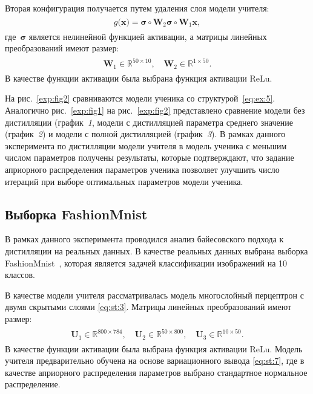 \documentclass[12pt]{a&t}
\begin{document}
Вторая конфигурация получается путем удаления слоя модели учителя:
\begin{gather}
\label{eq:ex:5}
\begin{aligned}
g\bigr(\mathbf{x}\bigr) = \bm{\sigma} \circ \mathbf{W}_2\bm{\sigma} \circ \mathbf{W}_1\mathbf{x},
\end{aligned}
\end{gather}
где~$\bm{\sigma}$ является нелинейной функцией активации, а матрицы линейных преобразований имеют размер:
\begin{gather}
\label{eq:ex:6}
\begin{aligned}
\mathbf{W}_{1} \in \mathbb{R}^{50 \times 10}, \quad \mathbf{W}_{2} \in \mathbb{R}^{1 \times 50}.
\end{aligned}
\end{gather}
 В качестве функции активации была выбрана функция активации $\text{ReLu}$.



На рис.~\ref{exp:fig2} сравниваются модели ученика со структурой~\eqref{eq:ex:5}.
Аналогично рис.~\ref{exp:fig1} на рис.~\ref{exp:fig2} представлено сравнение модели без дистилляции (график~\textit{1}, модели с дистилляцией параметра среднего значение (график~\textit{2}) и модели с полной дистилляцией (график~\textit{3}).
В рамках данного эксперимента по дистилляции модели учителя в модель ученика с меньшим числом параметров получены результаты, которые подтверждают, что задание априорного распределения параметров ученика позволяет улучшить число итераций при выборе оптимальных параметров модели ученика.

\subsection{Выборка FashionMnist}

В рамках данного эксперимента проводился анализ байесовского подхода к дистилляции на реальных данных.  В качестве реальных данных выбрана выборка FashionMnist~\cite{fashionmnist}, которая является задачей классификации изображений на 10 классов.

В качестве модели учителя рассматривалась модель многослойный перцептрон с двумя скрытыми слоями \eqref{eq:st:3}. Матрицы линейных преобразований имеют размер:
\begin{gather}
\label{eq:ex:7}
\begin{aligned}
\mathbf{U}_{1} \in \mathbb{R}^{800 \times 784}, \quad \mathbf{U}_{2} \in \mathbb{R}^{50 \times 800}, \quad \mathbf{U}_{3} \in \mathbb{R}^{10 \times 50}.
\end{aligned}
\end{gather}
В качестве функции активации была выбрана функция активации $\text{ReLu}$.
Модель учителя предварительно обучена на основе вариационного вывода \eqref{eq:st:7}, где в качестве априорного распределения параметров выбрано стандартное нормальное распределение.
\end{document}
